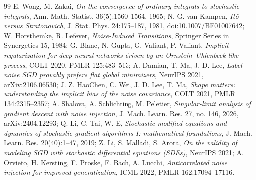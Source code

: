 \begin{thebibliography}{99}
E. Wong, M. Zakai, \emph{On the convergence of ordinary integrals to stochastic integrals}, Ann. Math. Statist.
36(5):1560--1564, 1965;
N. G. van Kampen, \emph{It\^o versus Stratonovich}, J. Stat. Phys. 24:175--187, 1981, doi:10.1007/BF01007642;
W. Horsthemke, R. Lefever, \emph{Noise-Induced Transitions}, Springer Series in Synergetics 15, 1984;
G. Blanc, N. Gupta, G. Valiant, P. Valiant, \emph{Implicit regularization for deep neural networks driven by an
Ornstein--Uhlenbeck like process}, COLT 2020, PMLR 125:483--513;
A. Damian, T. Ma, J. D. Lee, \emph{Label noise SGD provably prefers flat global minimizers}, NeurIPS 2021,
arXiv:2106.06530;
J. Z. HaoChen, C. Wei, J. D. Lee, T. Ma, \emph{Shape matters: understanding the implicit bias of the noise covariance},
COLT 2021, PMLR 134:2315--2357;
A. Shalova, A. Schlichting, M. Peletier, \emph{Singular-limit analysis of gradient descent with noise injection},
J. Mach. Learn. Res. 27, no. 146, 2026, arXiv:2404.12293;
Q. Li, C. Tai, W. E, \emph{Stochastic modified equations and dynamics of stochastic gradient algorithms I: mathematical
foundations}, J. Mach. Learn. Res. 20(40):1--47, 2019;
Z. Li, S. Malladi, S. Arora, \emph{On the validity of modeling SGD with stochastic differential equations (SDEs)},
NeurIPS 2021;
A. Orvieto, H. Kersting, F. Proske, F. Bach, A. Lucchi, \emph{Anticorrelated noise injection for improved
generalization}, ICML 2022, PMLR 162:17094--17116.


\end{thebibliography}
